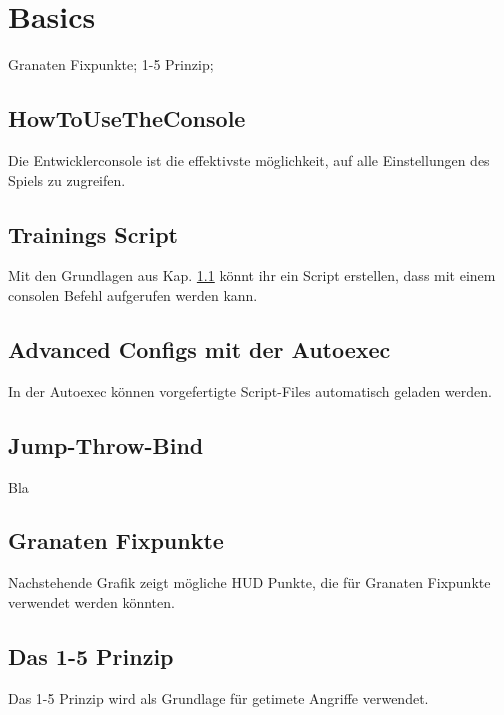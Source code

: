 \newpage




\chapter{Basics}
\label{chap:basics}
Granaten Fixpunkte; 1-5 Prinzip;

\section{HowToUseTheConsole}
\label{sect:console}
Die Entwicklerconsole ist die effektivste möglichkeit, auf alle Einstellungen des Spiels zu zugreifen.

\section{Trainings Script}
\label{sect:train_script}
Mit den Grundlagen aus Kap. \ref{sect:console} könnt ihr ein Script erstellen, dass mit einem consolen Befehl aufgerufen werden kann.

\section{Advanced Configs mit der Autoexec}
\label{sect:advanced_configs}
In der Autoexec können vorgefertigte Script-Files automatisch geladen werden.

\section{Jump-Throw-Bind}
\label{sect:jumpthrow}
Bla

\section{Granaten Fixpunkte}
\label{sect:granaten_fixpunkte}
Nachstehende Grafik zeigt mögliche HUD Punkte, die für Granaten Fixpunkte verwendet werden könnten.

\section{Das 1-5 Prinzip}
\label{sect:15Prinzip}
Das 1-5 Prinzip wird als Grundlage für getimete Angriffe verwendet.